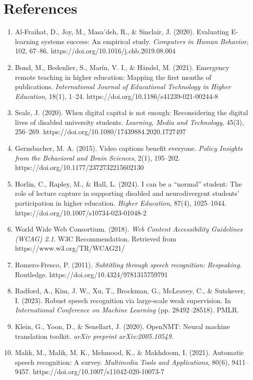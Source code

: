 \documentclass[12pt,a4paper]{article}
\begin{document}
\section*{References}
\begin{enumerate}
    \item Al-Fraihat, D., Joy, M., Masa'deh, R., \& Sinclair, J. (2020). Evaluating E-learning systems success: An empirical study. \textit{Computers in Human Behavior}, 102, 67--86. https://doi.org/10.1016/j.chb.2019.08.004
    \item Bond, M., Bedenlier, S., Mar\'in, V. I., \& H\"andel, M. (2021). Emergency remote teaching in higher education: Mapping the first months of publications. \textit{International Journal of Educational Technology in Higher Education}, 18(1), 1--24. https://doi.org/10.1186/s41239-021-00244-8
    \item Seale, J. (2020). When digital capital is not enough: Reconsidering the digital lives of disabled university students. \textit{Learning, Media and Technology}, 45(3), 256--269. https://doi.org/10.1080/17439884.2020.1727497
    \item Gernsbacher, M. A. (2015). Video captions benefit everyone. \textit{Policy Insights from the Behavioral and Brain Sciences}, 2(1), 195--202. https://doi.org/10.1177/2372732215602130
    \item Horlin, C., Rapley, M., \& Hall, L. (2024). I can be a ``normal'' student: The role of lecture capture in supporting disabled and neurodivergent students' participation in higher education. \textit{Higher Education}, 87(4), 1025--1044. https://doi.org/10.1007/s10734-023-01048-2
    \item World Wide Web Consortium. (2018). \textit{Web Content Accessibility Guidelines (WCAG) 2.1}. W3C Recommendation. Retrieved from https://www.w3.org/TR/WCAG21/
    \item Romero-Fresco, P. (2011). \textit{Subtitling through speech recognition: Respeaking}. Routledge. https://doi.org/10.4324/9781315759791
    \item Radford, A., Kim, J. W., Xu, T., Brockman, G., McLeavey, C., \& Sutskever, I. (2023). Robust speech recognition via large-scale weak supervision. In \textit{International Conference on Machine Learning} (pp. 28492--28518). PMLR.
    \item Klein, G., Yoon, D., \& Senellart, J. (2020). OpenNMT: Neural machine translation toolkit. \textit{arXiv preprint arXiv:2005.10549}.
    \item Malik, M., Malik, M. K., Mehmood, K., \& Makhdoom, I. (2021). Automatic speech recognition: A survey. \textit{Multimedia Tools and Applications}, 80(6), 9411--9457. https://doi.org/10.1007/s11042-020-10073-7

\end{enumerate}
\end{document}

